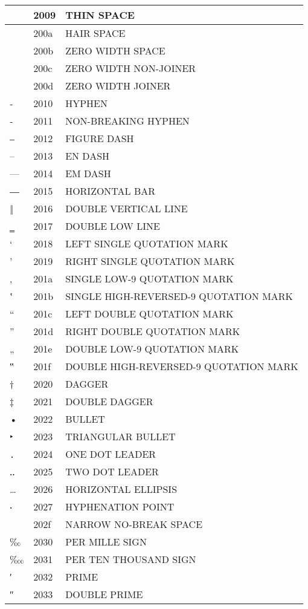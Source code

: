 \documentclass[12pt,letterpaper,openany]{book}
\begin{document}
\begin{center}
\begin{supertabular}{|m{0.25in}|m{0.5in}|m{4in}|}
& 2009 & THIN SPACE\\\hline
& 200a & HAIR SPACE\\\hline
​ & 200b & ZERO WIDTH SPACE\\\hline
‌ & 200c & ZERO WIDTH NON-JOINER\\\hline
‍ & 200d & ZERO WIDTH JOINER\\\hline
‐ & 2010 & HYPHEN\\\hline
‑ & 2011 & NON-BREAKING HYPHEN\\\hline
‒ & 2012 & FIGURE DASH\\\hline
– & 2013 & EN DASH\\\hline
— & 2014 & EM DASH\\\hline
― & 2015 & HORIZONTAL BAR\\\hline
‖ & 2016 & DOUBLE VERTICAL LINE\\\hline
‗ & 2017 & DOUBLE LOW LINE\\\hline
‘ & 2018 & LEFT SINGLE QUOTATION MARK\\\hline
’ & 2019 & RIGHT SINGLE QUOTATION MARK\\\hline
‚ & 201a & SINGLE LOW-9 QUOTATION MARK\\\hline
‛ & 201b & SINGLE HIGH-REVERSED-9 QUOTATION MARK\\\hline
“ & 201c & LEFT DOUBLE QUOTATION MARK\\\hline
” & 201d & RIGHT DOUBLE QUOTATION MARK\\\hline
„ & 201e & DOUBLE LOW-9 QUOTATION MARK\\\hline
‟ & 201f & DOUBLE HIGH-REVERSED-9 QUOTATION MARK\\\hline
† & 2020 & DAGGER\\\hline
‡ & 2021 & DOUBLE DAGGER\\\hline
• & 2022 & BULLET\\\hline
‣ & 2023 & TRIANGULAR BULLET\\\hline
․ & 2024 & ONE DOT LEADER\\\hline
‥ & 2025 & TWO DOT LEADER\\\hline
… & 2026 & HORIZONTAL ELLIPSIS\\\hline
‧ & 2027 & HYPHENATION POINT\\\hline
& 202f & NARROW NO-BREAK SPACE\\\hline
‰ & 2030 & PER MILLE SIGN\\\hline
‱ & 2031 & PER TEN THOUSAND SIGN\\\hline
′ & 2032 & PRIME\\\hline
″ & 2033 & DOUBLE PRIME\\\hline

\end{supertabular}
\end{center}
\end{document}
